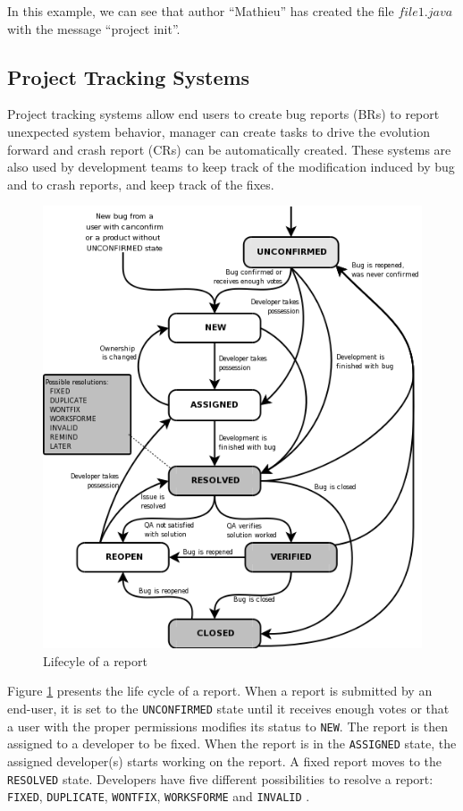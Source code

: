 In this example, we can see that author ``Mathieu'' has created the file $file1.java$ with the message ``project init''.

\subsection{Project Tracking Systems\label{sec:issue-tracking}}

Project tracking systems allow end users to create bug reports (BRs) to report unexpected system behavior,
manager can create tasks to drive the evolution forward and crash report (CRs) can be automatically created.
These systems are also used by development teams to keep track of the modification induced by bug and to crash reports, and keep track of the fixes.

\begin{figure}[h!]
	\centering
	\includegraphics[scale=0.5]{media/bzLifecycle.png}
	\caption{Lifecyle of a report \cite{Bugzilla2008}}
	\label{fig:bug-lifecyle}
\end{figure}

Figure \ref{fig:bug-lifecyle} presents the life cycle of a report.
When a report is submitted by an end-user, it is set to the {\tt UNCONFIRMED} state until it receives enough votes or that a user with the proper permissions modifies its status to {\tt NEW}.
The report is then assigned to a developer to be fixed.
When the report is in the {\tt ASSIGNED} state, the assigned developer(s) starts working on the report.
A fixed report moves to the {\tt RESOLVED} state. Developers have five different possibilities to resolve a report: {\tt FIXED}, {\tt DUPLICATE}, {\tt WONTFIX}, {\tt WORKSFORME} and {\tt INVALID} \cite{Koponen2006}.

